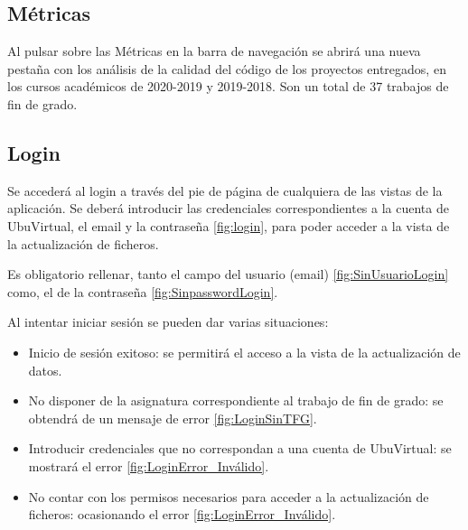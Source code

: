

\subsection{Métricas} 
Al pulsar sobre las Métricas en la barra de navegación se abrirá una nueva pestaña con los análisis de la calidad del código de los proyectos entregados, en los cursos académicos de 2020-2019 y 2019-2018. Son un total de 37 trabajos de fin de grado.

\subsection{Login} 
Se accederá al login a través del pie de página de cualquiera de las vistas de la aplicación. Se deberá introducir las credenciales correspondientes a la cuenta de UbuVirtual, el email y la contraseña \ref{fig:login}, para poder acceder a la vista de la actualización de ficheros.

Es obligatorio rellenar, tanto el campo del usuario (email) \ref{fig:SinUsuarioLogin} como, el de la contraseña \ref{fig:SinpasswordLogin}.


Al intentar iniciar sesión se pueden dar varias situaciones:
\begin{itemize}
	\item Inicio de sesión exitoso: se permitirá el acceso a la vista de la actualización de datos.
	
	\item No disponer de la asignatura correspondiente al trabajo de fin de grado: se obtendrá de un mensaje de error \ref{fig:LoginSinTFG}.  	
	
	\item Introducir credenciales que no correspondan a una cuenta de UbuVirtual: se mostrará el error \ref{fig:LoginError_Inválido}.	
	
	\item No contar con los permisos necesarios para acceder a la actualización de ficheros: ocasionando el error \ref{fig:LoginError_Inválido}.
\end{itemize}

